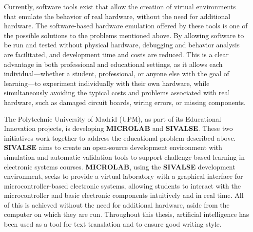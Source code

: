 Currently, software tools exist that allow the creation of virtual environments 
that emulate the behavior of real hardware, without the need for additional 
hardware. The software-based hardware emulation offered by these tools is one of the 
possible solutions to the problems mentioned above. By allowing software to be 
run and tested without physical hardware, debugging and behavior analysis are 
facilitated, and development time and costs are reduced. This is a clear advantage in 
both professional and educational settings, as it allows each individual—whether a 
student, professional, or anyone else with the goal of learning—to experiment 
individually with their own hardware, while simultaneously avoiding the typical costs 
and problems associated with real hardware, such as damaged circuit boards, wiring 
errors, or missing components.

The Polytechnic University of Madrid (UPM), as part of its Educational Innovation 
projects, is developing \textbf{MICROLAB}\cite{MICROLAB2025} and \textbf{SIVALSE}\cite{SIVALSE2024}. These two initiatives 
work together to address the educational problem described above. \textbf{SIVALSE} aims 
to create an open-source development environment with simulation and automatic 
validation tools to support challenge-based learning in electronic systems courses. 
\textbf{MICROLAB}, using the \textbf{SIVALSE} development environment, seeks to provide a 
virtual laboratory with a graphical interface for microcontroller-based electronic 
systems, allowing students to interact with the microcontroller and basic electronic 
components intuitively and in real time. All of this is achieved without the need for 
additional hardware, aside from the computer on which they are run. Throughout this thesis, artificial intelligence has been used as a tool for text translation and to ensure good writing style.



